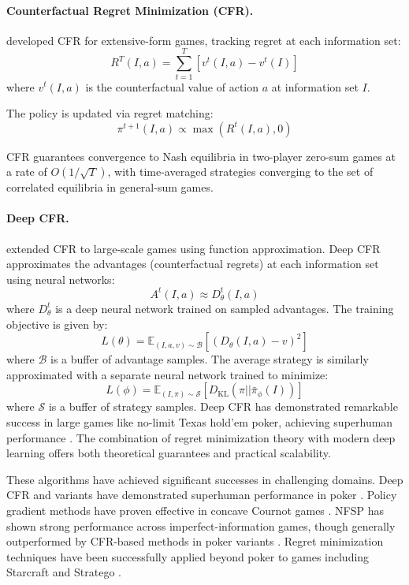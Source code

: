 \paragraph{Counterfactual Regret Minimization (CFR).} \citet{zinkevich2008} developed CFR for extensive-form games, tracking regret at each information set:
\begin{equation}
R^T(I,a) = \sum_{t=1}^{T} [v^t(I,a) - v^t(I)]
\end{equation}
where $v^t(I,a)$ is the counterfactual value of action $a$ at information set $I$.

The policy is updated via regret matching:
\begin{equation}
\pi^{t+1}(I,a) \propto \max(R^t(I,a), 0)
\end{equation}

CFR guarantees convergence to Nash equilibria in two-player zero-sum games at a rate of $O(1/\sqrt{T})$, with time-averaged strategies converging to the set of correlated equilibria in general-sum games.

\paragraph{Deep CFR.} \citet{Brown2019} extended CFR to large-scale games using function approximation. Deep CFR approximates the advantages (counterfactual regrets) at each information set using neural networks:
\begin{equation}
A^t(I,a) \approx D^t_{\theta}(I,a)
\end{equation}
where $D^t_{\theta}$ is a deep neural network trained on sampled advantages. The training objective is given by:
\begin{equation}
L(\theta) = \mathbb{E}_{(I,a,v) \sim \mathcal{B}} [(D_{\theta}(I,a) - v)^2]
\end{equation}
where $\mathcal{B}$ is a buffer of advantage samples. The average strategy is similarly approximated with a separate neural network trained to minimize:
\begin{equation}
L(\phi) = \mathbb{E}_{(I,\pi) \sim \mathcal{S}} [D_{\text{KL}}(\pi || \bar{\pi}_{\phi}(I))]
\end{equation}
where $\mathcal{S}$ is a buffer of strategy samples. Deep CFR has demonstrated remarkable success in large games like no-limit Texas hold'em poker, achieving superhuman performance \citep{brown2019_deepcfr}. The combination of regret minimization theory with modern deep learning offers both theoretical guarantees and practical scalability.

These algorithms have achieved significant successes in challenging domains. Deep CFR and variants have demonstrated superhuman performance in poker \citep{moravcik2017}. Policy gradient methods have proven effective in concave Cournot games \citep{Letcher2019}. NFSP has shown strong performance across imperfect-information games, though generally outperformed by CFR-based methods in poker variants \citep{moravcik2017}. Regret minimization techniques have been successfully applied beyond poker to games including Starcraft and Stratego \citep{deepmind2022}.
